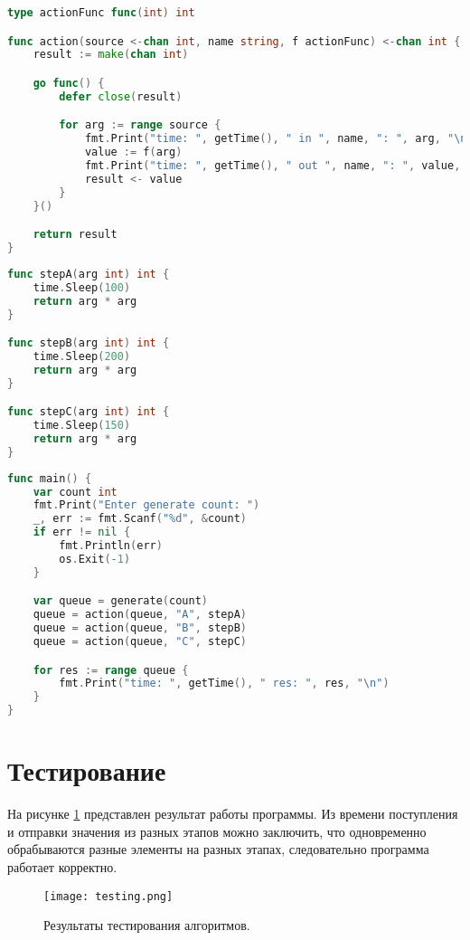         \begin{lstlisting}[language=go, label=lst:action, caption=Реализация декоратора этапа конвейера]
type actionFunc func(int) int

func action(source <-chan int, name string, f actionFunc) <-chan int {
    result := make(chan int)

    go func() {
        defer close(result)

        for arg := range source {
            fmt.Print("time: ", getTime(), " in ", name, ": ", arg, "\n")
            value := f(arg)
            fmt.Print("time: ", getTime(), " out ", name, ": ", value, "\n")
            result <- value
        }
    }()

    return result
}
        \end{lstlisting}

        \begin{lstlisting}[language=go, label=lst:action:step, caption=Реализация ступеней конвейера]
func stepA(arg int) int {
    time.Sleep(100)
    return arg * arg
}

func stepB(arg int) int {
    time.Sleep(200)
    return arg * arg
}

func stepC(arg int) int {
    time.Sleep(150)
    return arg * arg
}
        \end{lstlisting}
    
        \begin{lstlisting}[language=go, label=lst:main, caption=Реализация точки входа в программу]
func main() {
    var count int
    fmt.Print("Enter generate count: ")
    _, err := fmt.Scanf("%d", &count)
    if err != nil {
        fmt.Println(err)
        os.Exit(-1)
    }

    var queue = generate(count)
    queue = action(queue, "A", stepA)
    queue = action(queue, "B", stepB)
    queue = action(queue, "C", stepC)

    for res := range queue {
        fmt.Print("time: ", getTime(), " res: ", res, "\n")
    }
}
        \end{lstlisting}
        
    \section{Тестирование}
        На рисунке \ref{png:testing:result} представлен результат работы программы.
        Из времени поступления и отправки значения из разных этапов можно заключить, 
        что одновременно обрабываются разные элементы на разных этапах,
        следовательно программа работает корректно.

        \begin{figure}[h!]
            \centering
            \texttt{[image: testing.png]}
            \caption{Результаты тестирования алгоритмов.}
            \label{png:testing:result}
        \end{figure}
\newpage